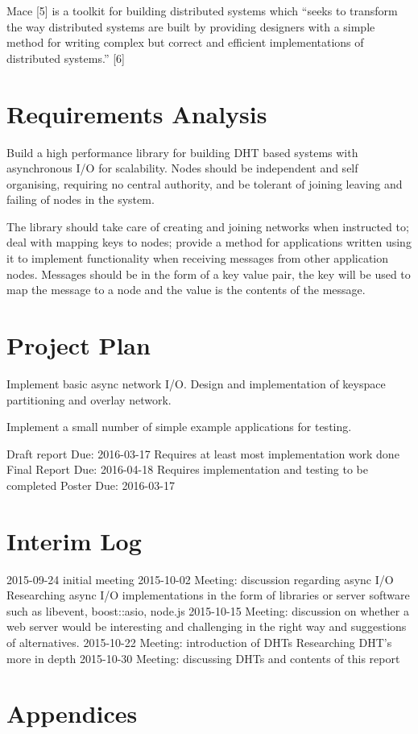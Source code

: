 \documentclass{article}
\begin{document}
Mace [5] is a toolkit for building distributed systems which “seeks to transform the way distributed systems are built by providing designers with a simple method for
writing complex but correct and efficient implementations of distributed systems.” [6]
\section{Requirements Analysis}
Build a high performance library for building DHT based systems with asynchronous I/O for scalability. Nodes should be independent and self organising, requiring no central authority, and be tolerant of joining leaving and failing of nodes in the system.

The library should take care of creating and joining networks when instructed to; deal with mapping keys to nodes; provide a method for applications written using it to implement functionality when receiving messages from other application nodes. Messages should be in the form of a key value pair, the key will be used to map the message to a node and the value is the contents of the message.
\section{Project Plan}
Implement basic async network I/O.
Design and implementation of keyspace partitioning and overlay network.

Implement a small number of simple example applications for testing.

Draft report
Due: 2016-03-17
Requires at least most implementation work done
Final Report
	Due: 2016-04-18
Requires implementation and testing to be completed	
Poster
Due: 2016-03-17



\section{Interim Log}
2015-09-24 initial meeting
2015-10-02 Meeting: discussion regarding async I/O
	Researching async I/O implementations in the form of libraries or server software such as libevent, boost::asio, node.js
2015-10-15 Meeting: discussion on whether a web server would be interesting and challenging in the right way and suggestions of alternatives.
2015-10-22 Meeting: introduction of DHTs
	Researching DHT’s more in depth 
2015-10-30 Meeting: discussing DHTs and contents of this report
\section{Appendices}
\end{document}
